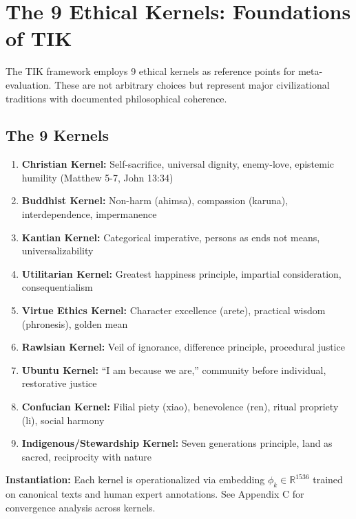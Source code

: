\documentclass[11pt,a4paper]{article}
\theoremstyle{definition}
\theoremstyle{remark}
\begin{document}
\section{The 9 Ethical Kernels: Foundations of TIK}
\label{sec:kernels}

The TIK framework employs 9 ethical kernels as reference points for meta-evaluation. 
These are not arbitrary choices but represent major civilizational traditions with 
documented philosophical coherence.

\subsection{The 9 Kernels}

\begin{enumerate}
\item \textbf{Christian Kernel:} Self-sacrifice, universal dignity, enemy-love, 
epistemic humility (Matthew 5-7, John 13:34)

\item \textbf{Buddhist Kernel:} Non-harm (ahimsa), compassion (karuna), 
interdependence, impermanence

\item \textbf{Kantian Kernel:} Categorical imperative, persons as ends not means, 
universalizability

\item \textbf{Utilitarian Kernel:} Greatest happiness principle, impartial 
consideration, consequentialism

\item \textbf{Virtue Ethics Kernel:} Character excellence (arete), practical 
wisdom (phronesis), golden mean

\item \textbf{Rawlsian Kernel:} Veil of ignorance, difference principle, 
procedural justice

\item \textbf{Ubuntu Kernel:} ``I am because we are,'' community before individual, 
restorative justice

\item \textbf{Confucian Kernel:} Filial piety (xiao), benevolence (ren), ritual 
propriety (li), social harmony

\item \textbf{Indigenous/Stewardship Kernel:} Seven generations principle, 
land as sacred, reciprocity with nature
\end{enumerate}

\textbf{Instantiation:} Each kernel is operationalized via embedding $\phi_k \in 
\mathbb{R}^{1536}$ trained on canonical texts and human expert annotations. See 
Appendix C for convergence analysis across kernels.
\end{document}
